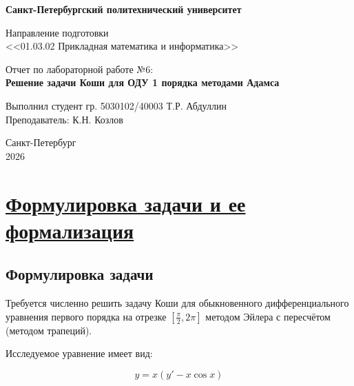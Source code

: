 \documentclass[14pt]{extarticle}
\begin{document}
	
	\thispagestyle{empty}
	
	\begin{center}
		
		\textbf{Санкт-Петербургский политехнический университет}\\
		\vspace{2cm}
		
		Направление подготовки \\
		\large <<01.03.02 Прикладная математика и информатика>>\\
		
		\vspace{7cm}
		
		Отчет по лабораторной работе №6:\\
		\vspace{0.2cm}
		\textbf{\LARGE Решение задачи Коши для ОДУ 1 порядка методами Адамса}
		
		\vspace{6cm}
		
		\begin{flushleft}
			Выполнил студент гр. 5030102/40003 \hfill Т.Р. Абдуллин\\
			Преподаватель: \hfill К.Н. Козлов\\
		\end{flushleft}
		
		\vspace{3cm}
		
		Санкт-Петербург\\
		2026
	\end{center}
	
	
	\tableofcontents
	\newpage
	\section{\Large \underline{Формулировка задачи и ее формализация}}
	\subsection{Формулировка задачи}
	
	Требуется численно решить задачу Коши для обыкновенного
	дифференциального уравнения первого порядка на отрезке
	$\left[\frac{\pi}{2}, 2\pi\right]$
	методом Эйлера с пересчётом (методом трапеций).
	
	Исследуемое уравнение имеет вид:
	
	\[
	y = x(y' - x\cos x)
	\]
	
\end{document}
